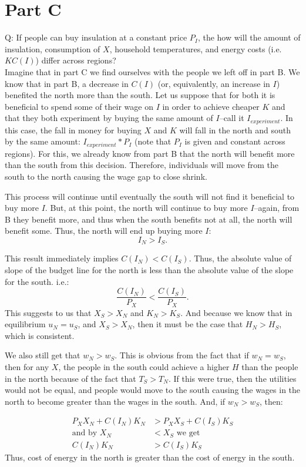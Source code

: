 \documentclass[12pt]{paper}
\begin{document}
\section{Part C}
Q: If people can buy insulation at a constant price $P_I$, the how will the amount of insulation, consumption of $X$, household temperatures, and energy costs (i.e. $KC(I)$) differ across regions?
\\

Imagine that in part C we find ourselves with the people we left off in part B. We know that in part B, a decrease in $C(I)$ (or, equivalently, an increase in $I$) benefited the north more than the south. Let us suppose that for both it is beneficial to spend some of their wage on $I$ in order to achieve cheaper $K$ and that they both experiment by buying the same amount of $I$--call it $I_{experiment}$. In this case, the fall in money for buying $X$ and $K$ will fall in the north and south by the same amount: $I_{experiment}*P_I$ (note that $P_I$ is given and constant across regions). For this, we already know from part B that the north will benefit more than the south from this decision. Therefore, individuals will move from the south to the north causing the wage gap to close shrink. 

This process will continue until eventually the south will not find it beneficial to buy more $I$. But, at this point, the north will continue to buy more $I$--again, from B they benefit more, and thus when the south benefits not at all, the north will benefit some. Thus, the north will end up buying more $I$:
\[
I_N>I_S.
\]

This result immediately implies $C(I_N)<C(I_S)$. Thus, the absolute value of slope of the budget line for the north is less than the absolute value of the slope for the south. i.e.:
\[
\frac{C(I_N)}{P_X}<\frac{C(I_S)}{P_X}.
\]
This suggests to us that $X_S>X_N$ and $K_N>K_S$. And because we know that in equilibrium $u_N=u_S$, and $X_S>X_N$, then it must be the case that $H_N>H_S$, which is consistent.

We also still get that $w_N>w_S$. This is obvious from the fact that if $w_N=w_S$, then for any $X$, the people in the south could achieve a higher $H$ than the people in the north because of the fact that $T_S>T_N$. If this were true, then the utilities would not be equal, and people would move to the south causing the wages in the north to become greater than the wages in the south. And, if $w_N>w_S$, then:

\begin{align*}
P_XX_N+C(I_N)K_N&>P_XX_S+C(I_S)K_S\\
\text{and by } X_N&<X_S \text{ we get}\\
C(I_N)K_N&>C(I_S)K_S
\end{align*}
Thus, cost of energy in the north is greater than the cost of energy in the south.
\end{document}
